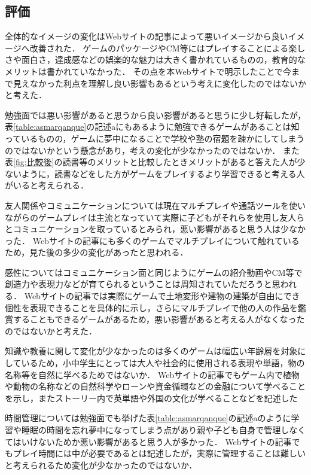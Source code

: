 \documentclass[12pt,a4j,titlepage]{ltjsarticle}
\begin{document}
\subsection{評価}
全体的なイメージの変化はWebサイトの記事によって悪いイメージから良いイメージへ改善された．
ゲームのパッケージやCM等にはプレイすることによる楽しさや面白さ，達成感などの娯楽的な魅力は大きく書かれているものの，教育的なメリットは書かれていなかった．
その点を本Webサイトで明示したことで今まで見えなかった利点を理解し良い影響もあるという考えに変化したのではないかと考えた．


勉強面では悪い影響があると思うから良い影響があると思うに少し好転したが，表\ref{table:asmarqanque}の記述aにもあるように勉強できるゲームがあることは知っているものの，ゲームに夢中になることで学校や塾の宿題を疎かにしてしまうのではないかという懸念があり，考えの変化が少なかったのではないか．
また表\ref{fig:比較後}の読書等のメリットと比較したときメリットがあると答えた人が少ないように，読書などをした方がゲームをプレイするより学習できると考える人がいると考えられる．

友人関係やコミュニケーションについては現在マルチプレイや通話ツールを使いながらのゲームプレイは主流となっていて実際に子どもがそれらを使用し友人らとコミュニケーションを取っているとみられ，悪い影響があると思う人は少なかった．
Webサイトの記事にも多くのゲームでマルチプレイについて触れているため，見た後の多少の変化があったと思われる．

感性についてはコミュニケーション面と同じようにゲームの紹介動画やCM等で創造力や表現力などが育てられるということは周知されていただろうと思われる．
Webサイトの記事では実際にゲームで土地変形や建物の建築が自由にでき個性を表現できることを具体的に示し，さらにマルチプレイで他の人の作品を鑑賞することもできるゲームがあるため，悪い影響があると考える人がなくなったのではないかと考えた．

知識や教養に関して変化が少なかったのは多くのゲームは幅広い年齢層を対象にしているため，小中学生にとっては大人や社会的に使用される表現や単語，物の名称等を自然に学べるためではないか．
Webサイトの記事でもゲーム内で植物や動物の名称などの自然科学やローンや資金循環などの金融について学べることを示し，またストーリー内で英単語や外国の文化が学べることなどを記述した

時間管理については勉強面でも挙げた表\ref{table:asmarqanque}の記述aのように学習や睡眠の時間を忘れ夢中になってしまう点があり親や子ども自身で管理しなくてはいけないためか悪い影響があると思う人が多かった．
Webサイトの記事でもプレイ時間には中が必要であるとは記述したが，実際に管理することは難しいと考えられるため変化が少なかったのではないか．
\end{document}
